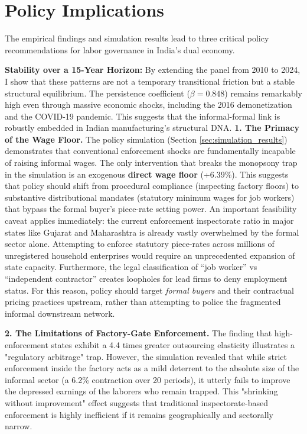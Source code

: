 \section{Policy Implications}
\label{sec:policy_implications}

The empirical findings and simulation results lead to three critical policy recommendations for labor governance in India's dual economy.

\textbf{Stability over a 15-Year Horizon:} By extending the panel from 2010 to 2024, I show that these patterns are not a temporary transitional friction but a stable structural equilibrium. The persistence coefficient ($\beta=0.848$) remains remarkably high even through massive economic shocks, including the 2016 demonetization and the COVID-19 pandemic. This suggests that the informal-formal link is robustly embedded in Indian manufacturing's structural DNA.
\textbf{1. The Primacy of the Wage Floor.} The policy simulation (Section \ref{sec:simulation_results}) demonstrates that conventional enforcement shocks are fundamentally incapable of raising informal wages. The only intervention that breaks the monopsony trap in the simulation is an exogenous \textbf{direct wage floor} (+6.39\%). This suggests that policy should shift from procedural compliance (inspecting factory floors) to substantive distributional mandates (statutory minimum wages for job workers) that bypass the formal buyer's piece-rate setting power. An important feasibility caveat applies immediately: the current enforcement inspectorate ratio in major states like Gujarat and Maharashtra is already vastly overwhelmed by the formal sector alone. Attempting to enforce statutory piece-rates across millions of unregistered household enterprises would require an unprecedented expansion of state capacity. Furthermore, the legal classification of ``job worker'' vs ``independent contractor'' creates loopholes for lead firms to deny employment status. For this reason, policy should target \textit{formal buyers} and their contractual pricing practices upstream, rather than attempting to police the fragmented informal downstream network.

\textbf{2. The Limitations of Factory-Gate Enforcement.} The finding that high-enforcement states exhibit a 4.4 times greater outsourcing elasticity illustrates a "regulatory arbitrage" trap. However, the simulation revealed that while strict enforcement inside the factory acts as a mild deterrent to the absolute size of the informal sector (a 6.2\% contraction over 20 periods), it utterly fails to improve the depressed earnings of the laborers who remain trapped. This "shrinking without improvement" effect suggests that traditional inspectorate-based enforcement is highly inefficient if it remains geographically and sectorally narrow.

